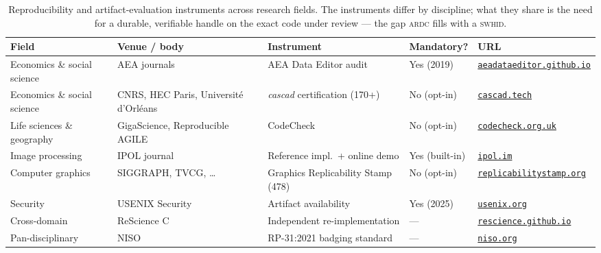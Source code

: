 \begin{table}[htbp]
  \centering\footnotesize
  \setlength{\tabcolsep}{4pt}
  \begin{tabularx}{\linewidth}{@{}>{\raggedright\arraybackslash}p{2.4cm} >{\raggedright\arraybackslash}p{2.6cm} X >{\raggedright\arraybackslash}p{1.8cm} >{\raggedright\arraybackslash}p{1.65cm}@{}}
    \toprule
    \textbf{Field} & \textbf{Venue / body} & \textbf{Instrument} & \textbf{Mandatory?} & \textbf{URL} \\
    \midrule
    Economics \& social science & AEA journals & AEA Data Editor audit & Yes (2019) & \href{https://aeadataeditor.github.io}{\scriptsize\nolinkurl{aeadataeditor.github.io}} \\
    Economics \& social science & CNRS, HEC Paris, Université d'Orléans & \emph{cascad} certification (170+) & No (opt-in) & \href{https://cascad.tech}{\scriptsize\nolinkurl{cascad.tech}} \\
    Life sciences \& geography & GigaScience, Reproducible AGILE & CodeCheck & No (opt-in) & \href{https://codecheck.org.uk}{\scriptsize\nolinkurl{codecheck.org.uk}} \\
    Image processing & IPOL journal & Reference impl.\ + online demo & Yes (built-in) & \href{https://www.ipol.im/}{\scriptsize\nolinkurl{ipol.im}} \\
    Computer graphics & SIGGRAPH, TVCG, \ldots & Graphics Replicability Stamp (478)~\autocite{replicabilitystamp} & No (opt-in) & \href{http://www.replicabilitystamp.org/}{\scriptsize\nolinkurl{replicabilitystamp.org}} \\
    Security & USENIX Security & Artifact availability & Yes (2025) & \href{https://www.usenix.org/conference/usenixsecurity25}{\scriptsize\nolinkurl{usenix.org}} \\
    Cross-domain & ReScience C & Independent re-implementation & --- & \href{https://rescience.github.io}{\scriptsize\nolinkurl{rescience.github.io}} \\
    Pan-disciplinary & NISO & RP-31:2021 badging standard & --- & \href{https://www.niso.org/publications/rp-31-2021-badging}{\scriptsize\nolinkurl{niso.org}} \\
    \bottomrule
  \end{tabularx}
  \caption[Artifact evaluation beyond computer science]{Reproducibility and artifact-evaluation
  instruments across research fields. The instruments differ by discipline; what they share is the
  need for a durable, verifiable handle on the exact code under review --- the gap \textsc{ardc}
  fills with a \textsc{swhid}.}
  \label{tab:beyond-cs}
\end{table}

